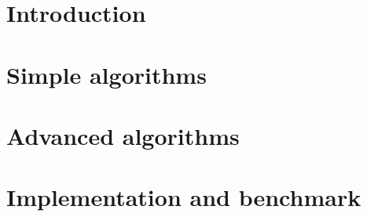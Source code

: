 \documentclass{report}
\begin{document}

\pagebreak




\tableofcontents

\pagebreak

\chapter{Introduction}


\chapter{Simple algorithms}


\chapter{Advanced algorithms}


\chapter {Implementation and benchmark}


\addappheadtotoc

\printbibliography
\end{document}
